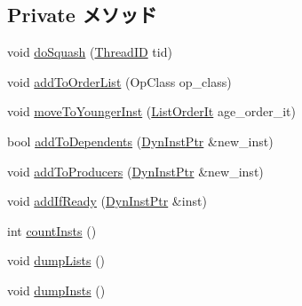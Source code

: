\subsection*{Private メソッド}
\begin{DoxyCompactItemize}
\item 
void \hyperlink{classInstructionQueue_a06cf52c4f09162bea03ec848f247151a}{doSquash} (\hyperlink{base_2types_8hh_ab39b1a4f9dad884694c7a74ed69e6a6b}{ThreadID} tid)
\item 
void \hyperlink{classInstructionQueue_aa1de4a5c314cc1d0efaf045e05e47165}{addToOrderList} (OpClass op\_\-class)
\item 
void \hyperlink{classInstructionQueue_ae4cc92176e08b27989bb2838e4e32b1c}{moveToYoungerInst} (\hyperlink{classInstructionQueue_a120a1fba4fe015f7201e896580df164c}{ListOrderIt} age\_\-order\_\-it)
\item 
bool \hyperlink{classInstructionQueue_abeb630fedb38de020599d2a1abd4b02d}{addToDependents} (\hyperlink{classInstructionQueue_a028ce10889c5f6450239d9e9a7347976}{DynInstPtr} \&new\_\-inst)
\item 
void \hyperlink{classInstructionQueue_af89be5ea301621fdfb44941b4db60339}{addToProducers} (\hyperlink{classInstructionQueue_a028ce10889c5f6450239d9e9a7347976}{DynInstPtr} \&new\_\-inst)
\item 
void \hyperlink{classInstructionQueue_a7e3f1fa43ca939ed6fd9b3abcc47f06e}{addIfReady} (\hyperlink{classInstructionQueue_a028ce10889c5f6450239d9e9a7347976}{DynInstPtr} \&inst)
\item 
int \hyperlink{classInstructionQueue_ab654970f03abd90f0c397bba8e218bc9}{countInsts} ()
\item 
void \hyperlink{classInstructionQueue_a3d1dae45e8e0b5cf7c1f4f8c796d070e}{dumpLists} ()
\item 
void \hyperlink{classInstructionQueue_a80587b4fe043bbe1995536cb3b361588}{dumpInsts} ()
\end{DoxyCompactItemize}
